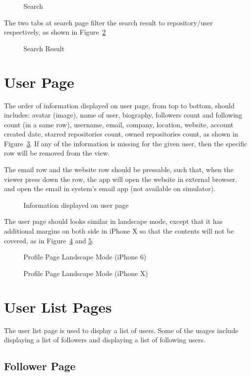 \documentclass[12pt]{article}
\newcommand{\imgh}[4]{
    \begin{figure}[!htbp]%
    \begin{center}
    \subfloat{{\texttt{[image: \#2]} }}%
    \qquad
    \subfloat{{\texttt{[image: \#3]} }}%
    \caption{#4}\label{#2}
    \end{center}
\end{figure}
}
\begin{document}
\imgh{0.45}{search}{search_iphoneX}{Search}

The two tabs at search page filter the search result to repository/user respectively, as shown in Figure~\ref{search_repository}

\imgh{0.45}{search_repository}{search_user}{Search Result}

\section{User Page}

The order of information displayed on user page, from top to bottom, should includes: avatar (image), name of user, biography, followers count and following count (in a same row), username, email, company, location, website, account created date, starred repositories count, owned repositories count, as shown in Figure~\ref{user_bottom}. If any of the information is missing for the given user, then the specific row will be removed from the view.

The email row and the website row should be pressable, such that, when the viewer press down the row, the app will open the website in external browser. and open the email in system's email app (not available on simulator).

\imgh{0.45}{user_bottom}{initial_user_iphoneX}{Information displayed on user page}

The user page should looks similar in landscape mode, except that it has additional margins on both side in iPhone X so that the contents will not be covered, as in Figure~\ref{landscape_user} and \ref{landscape_user_iphoneX}.

\imgh{0.45}{landscape_user}{landscape_user_bottom}{Profile Page Landscape Mode (iPhone 6)}

\imgh{0.45}{landscape_user_iphoneX}{landscape_user_right}{Profile Page Landscape Mode (iPhone X)}

\section{User List Pages}

The user list page is used to display a list of users. Some of the usages include displaying a list of followers and displaying a list of following users.

\subsection{Follower Page}
\end{document}
